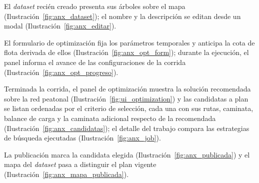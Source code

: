 El \textit{dataset} recién creado presenta sus árboles sobre el mapa
(Ilustración~\ref{fig:anx_dataset}); el nombre y la descripción se editan desde un modal
(Ilustración~\ref{fig:anx_editar}).



El formulario de optimización fija los parámetros temporales y anticipa la cota de flota derivada
de ellos (Ilustración~\ref{fig:anx_opt_form}); durante la ejecución, el panel informa el avance de
las configuraciones de la corrida (Ilustración~\ref{fig:anx_opt_progreso}).



Terminada la corrida, el panel de optimización muestra la solución recomendada sobre la red
peatonal (Ilustración~\ref{fig:ui_optimization}) y las candidatas a plan se listan ordenadas por el
criterio de selección, cada una con sus rutas, caminata, balance de carga y la caminata adicional
respecto de la recomendada (Ilustración~\ref{fig:anx_candidatas}); el detalle del trabajo compara
las estrategias de búsqueda ejecutadas (Ilustración~\ref{fig:anx_job}).




La publicación marca la candidata elegida (Ilustración~\ref{fig:anx_publicada}) y el mapa del
\textit{dataset} pasa a distinguir el plan vigente (Ilustración~\ref{fig:anx_mapa_publicada}).

